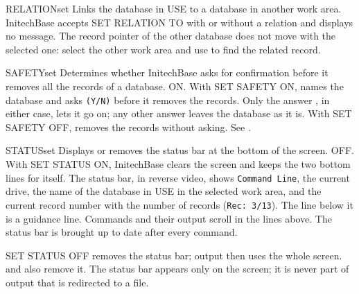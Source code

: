 \begin{XbaseEntry}{RELATION}{set}
Links the database in USE to a database in another work area.
\Syntax
{}
\Usage
InitechBase accepts SET RELATION TO with or without a relation and displays no
message.  The record pointer of the other database does not move with the
selected one: select the other work area and use  to find the related
record.
\end{XbaseEntry}

\begin{XbaseEntry}{SAFETY}{set}
Determines whether InitechBase asks for confirmation before it removes all
the records of a database.
\Syntax
{}
\Defaults
ON.
\Usage
With SET SAFETY ON,  names the database and asks \texttt{(Y/N)}
before it removes the records.  Only the answer , in either case,
lets it go on; any other answer leaves the database as it is.  With SET
SAFETY OFF,  removes the records without asking.
\Examples
See .
\end{XbaseEntry}

\begin{XbaseEntry}{STATUS}{set}
Displays or removes the status bar at the bottom of the screen.
\Syntax
{}
\Defaults
OFF.
\Usage
With SET STATUS ON, InitechBase clears the screen and keeps the two bottom
lines for itself.  The status bar, in reverse video, shows \texttt{Command
Line}, the current drive, the name of the database in USE in the selected
work area, and the current record number with the number of records
(\texttt{Rec: 3/13}).  The line below it is a guidance line.  Commands and their
output scroll in the lines above.  The status bar is brought up to date after
every command.

SET STATUS OFF removes the status bar; output then uses the whole screen.
 and  also remove it.  The status bar appears only on the
screen; it is never part of output that is redirected to a file.
\end{XbaseEntry}

